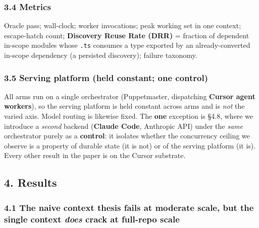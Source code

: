 \documentclass[
  10pt,
]{article}
\begin{document}
\subsubsection{3.4 Metrics}\label{metrics}

Oracle pass; wall-clock; worker invocations; peak working set in one
context; escape-hatch count; \textbf{Discovery Reuse Rate (DRR)} =
fraction of dependent in-scope modules whose \texttt{.ts} consumes a
type exported by an already-converted in-scope dependency (a persisted
discovery); failure taxonomy.

\subsubsection{3.5 Serving platform (held constant; one
control)}\label{serving-platform-held-constant-one-control}

All arms run on a single orchestrator (Puppetmaster, dispatching
\textbf{Cursor agent workers}), so the serving platform is held constant
across arms and is \emph{not} the varied axis. Model routing is likewise
fixed. The \textbf{one} exception is §4.8, where we introduce a
\emph{second} backend (\textbf{Claude Code}, Anthropic API) under the
\emph{same} orchestrator purely as a \textbf{control}: it isolates
whether the concurrency ceiling we observe is a property of durable
state (it is not) or of the serving platform (it is). Every other result
in the paper is on the Cursor substrate.

\subsection{4. Results}\label{results}

\subsubsection{\texorpdfstring{4.1 The naive context thesis fails at
moderate scale, but the single context \emph{does} crack at full-repo
scale}{4.1 The naive context thesis fails at moderate scale, but the single context does crack at full-repo scale}}\label{the-naive-context-thesis-fails-at-moderate-scale-but-the-single-context-does-crack-at-full-repo-scale}
\end{document}
